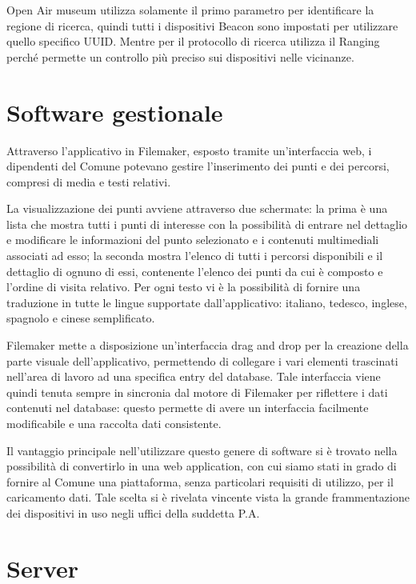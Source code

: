 Open Air museum utilizza solamente il primo parametro per identificare la regione di ricerca, quindi tutti i dispositivi Beacon sono impostati per utilizzare quello specifico UUID. Mentre per il protocollo di ricerca utilizza il Ranging perché permette un controllo più preciso sui dispositivi nelle vicinanze.

\section{Software gestionale}\vspace{5mm}

	Attraverso l’applicativo in Filemaker, esposto tramite un’interfaccia web, i dipendenti del Comune potevano gestire l’inserimento dei punti e dei percorsi, compresi di media e testi relativi. \vspace{5mm}
	
La visualizzazione dei punti avviene attraverso due schermate: la prima è una lista che mostra tutti i punti di interesse con la possibilità di entrare nel dettaglio e modificare le informazioni del punto selezionato e i contenuti multimediali associati ad esso; la seconda mostra l'elenco di tutti i percorsi disponibili e il dettaglio di ognuno di essi, contenente l'elenco dei punti da cui è composto e l'ordine di visita relativo. Per ogni testo vi è la possibilità di fornire una traduzione in tutte le lingue supportate dall'applicativo: italiano, tedesco, inglese, spagnolo e cinese semplificato.\vspace{5mm}

Filemaker mette a disposizione un'interfaccia drag and drop per la creazione della parte visuale dell'applicativo, permettendo di collegare i vari elementi trascinati nell'area di lavoro ad una specifica entry del database. Tale interfaccia viene quindi tenuta sempre in sincronia dal motore di Filemaker per riflettere i dati contenuti nel database: questo permette di avere un interfaccia facilmente modificabile e una raccolta dati consistente.\vspace{5mm}

Il vantaggio principale nell'utilizzare questo genere di software si è trovato nella possibilità di convertirlo in una web application, con cui siamo stati in grado di fornire al Comune una piattaforma, senza particolari requisiti di utilizzo, per il caricamento dati. Tale scelta si è rivelata vincente vista la grande frammentazione dei dispositivi in uso negli uffici della suddetta P.A.

\section{Server}\vspace{5mm}
	
